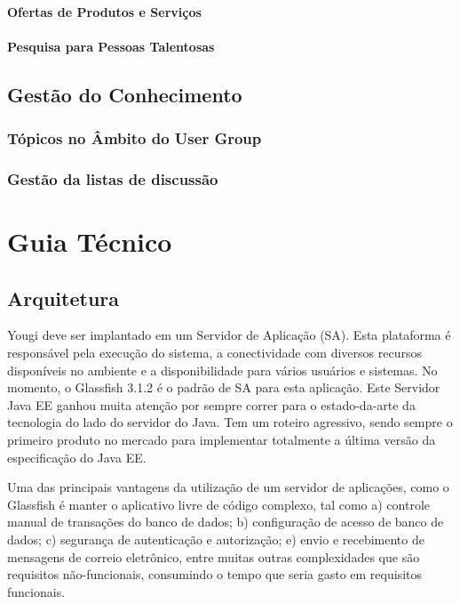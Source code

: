 \documentclass[envcountsame,envcountchap,letterpaper]{svmono}
\begin{document}
\subsection{Ofertas de Produtos e Serviços}

\subsection{Pesquisa para Pessoas Talentosas}

\chapter{Gestão do Conhecimento}

\section{Tópicos no Âmbito do User Group}

\section{Gestão da listas de discussão}

\part{Guia Técnico}

\chapter{Arquitetura}

Yougi deve ser implantado em um Servidor de Aplicação (SA). Esta plataforma é responsável pela execução do sistema, a conectividade com diversos recursos disponíveis no ambiente e a disponibilidade para vários usuários e sistemas. No momento, o Glassfish 3.1.2 é o padrão de SA para esta aplicação. Este Servidor Java EE ganhou muita atenção por sempre correr para o estado-da-arte da tecnologia do lado do servidor do Java. Tem um roteiro agressivo, sendo sempre o primeiro produto no mercado para implementar totalmente a última versão da especificação do Java EE.

Uma das principais vantagens da utilização de um servidor de aplicações, como o Glassfish é manter o aplicativo livre de código complexo, tal como a) controle manual de transações do banco de dados; b) configuração de acesso de banco de dados; c) segurança de autenticação e autorização; e) envio e recebimento de mensagens de correio eletrônico, entre muitas outras complexidades que são requisitos não-funcionais, consumindo o tempo que seria gasto em requisitos funcionais.
\end{document}
